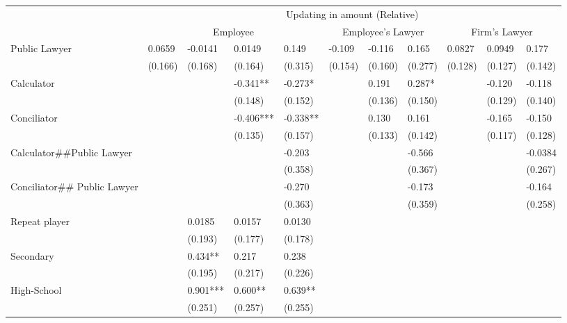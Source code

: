 \begin{tabular}{lllllllllll}
\cmidrule{2-11}\multicolumn{1}{l|}{} & \multicolumn{10}{c|}{Updating in amount (Relative)} \\
\cmidrule{2-11}      & \multicolumn{4}{c}{Employee}  & \multicolumn{3}{c}{Employee's Lawyer} & \multicolumn{3}{c}{Firm's  Lawyer} \\
\cmidrule{2-11}Public Lawyer & 0.0659 & -0.0141 & 0.0149 & 0.149 & -0.109 & -0.116 & 0.165 & 0.0827 & 0.0949 & 0.177 \\
      & (0.166) & (0.168) & (0.164) & (0.315) & (0.154) & (0.160) & (0.277) & (0.128) & (0.127) & (0.142) \\
Calculator &       &       & -0.341** & -0.273* &       & 0.191 & 0.287* &       & -0.120 & -0.118 \\
      &       &       & (0.148) & (0.152) &       & (0.136) & (0.150) &       & (0.129) & (0.140) \\
Conciliator &       &       & -0.406*** & -0.338** &       & 0.130 & 0.161 &       & -0.165 & -0.150 \\
      &       &       & (0.135) & (0.157) &       & (0.133) & (0.142) &       & (0.117) & (0.128) \\
Calculator\#\#Public Lawyer &       &       &       & -0.203 &       &       & -0.566 &       &       & -0.0384 \\
      &       &       &       & (0.358) &       &       & (0.367) &       &       & (0.267) \\
Conciliator\#\# Public Lawyer &       &       &       & -0.270 &       &       & -0.173 &       &       & -0.164 \\
      &       &       &       & (0.363) &       &       & (0.359) &       &       & (0.258) \\
Repeat player &       & 0.0185 & 0.0157 & 0.0130 &       &       &       &       &       &  \\
      &       & (0.193) & (0.177) & (0.178) &       &       &       &       &       &  \\
Secondary &       & 0.434** & 0.217 & 0.238 &       &       &       &       &       &  \\
      &       & (0.195) & (0.217) & (0.226) &       &       &       &       &       &  \\
High-School &       & 0.901*** & 0.600** & 0.639** &       &       &       &       &       &  \\
      &       & (0.251) & (0.257) & (0.255) &       &       &       &       &       &  \\

\end{tabular}

